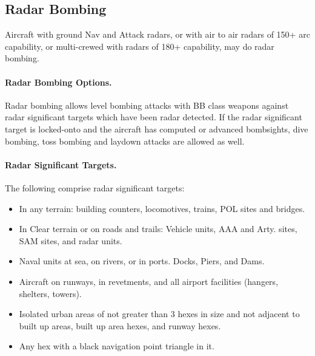 \begin{advancedrules}
\begin{itemize}
\end{itemize}

\subsection{Radar Bombing}

Aircraft with ground Nav and Attack radars, or with air to air radars of 150+ arc capability, or multi-crewed with radars of 180+ capability, may do radar bombing.

\paragraph{Radar Bombing Options.} Radar bombing allows level bombing attacks with BB class weapons against radar significant targets which have been radar detected. If the radar significant target is locked-onto and the aircraft has computed or advanced bombsights, dive bombing, toss bombing and laydown attacks are allowed as well.

\paragraph{Radar Significant Targets.} The following comprise radar significant targets:

\begin{itemize}

    \item In any terrain: building counters, locomotives, trains, POL sites and bridges.

    \item In Clear terrain or on roads and trails: Vehicle units, AAA and Arty. sites, SAM sites, and radar units.

    \item Naval units at sea, on rivers, or in ports. Docks, Piers, and Dams.

    \item Aircraft on runways, in revetments, and all airport facilities (hangers, shelters, towers).

    \item Isolated urban areas of not greater than 3 hexes in size and not adjacent to built up areas, built up area hexes, and runway hexes.
    
    \item Any hex with a black navigation point triangle in it.

\end{itemize}


\end{advancedrules}
